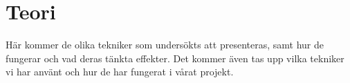 \section{Teori}
\label{sec:bjorn-theory}

Här kommer de olika tekniker som undersökts att presenteras, samt hur de fungerar och vad deras tänkta effekter. Det kommer även tas upp vilka tekniker vi har använt och hur de har fungerat i vårat projekt.